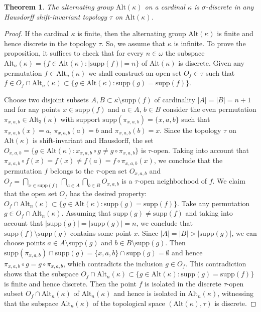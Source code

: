 \documentclass[11pt, twoside]{amsart}
\newtheorem{theorem}{Theorem}
\theoremstyle{definition}
\begin{document}
\begin{theorem}\label{sigmad} The alternating group ${\mathrm{Alt}}(\kappa)$ on a cardinal $\kappa$ is $\sigma$-discrete in any Hausdorff shift-invariant topology $\tau$ on ${\mathrm{Alt}}(\kappa)$.
\end{theorem}

\begin{proof} If the cardinal $\kappa$ is finite, then the alternating group ${\mathrm{Alt}}(\kappa)$ is finite and hence discrete in the topology $\tau$. So, we assume that $\kappa$ is infinite.  To prove the proposition, it suffices to check that for every $n\in{\omega}$ the subspace ${\mathrm{Alt}}_{n}(\kappa)=\{f\in{\mathrm{Alt}}(\kappa):|{\mathrm{supp}}(f)|= n\}$ of ${\mathrm{Alt}}(\kappa)$ is discrete. Given any permutation $f\in {\mathrm{Alt}}_{n}(\kappa)$ we shall construct an open set $O_f\in\tau$ such that $f\in O_f\cap {\mathrm{Alt}}_n(\kappa)\subset \{g\in {\mathrm{Alt}}(\kappa):{\mathrm{supp}}(g)={\mathrm{supp}}(f)\}$.

Choose two disjoint subsets $A,B\subset \kappa\setminus{\mathrm{supp}}(f)$ of cardinality $|A|=|B|=n+1$ and for any points $x\in{\mathrm{supp}}(f)$ and $a\in A$, $b\in B$  consider the even permutation $\pi_{x,a,b}\in {\mathrm{Alt}}_{3}(\kappa)$ with support ${\mathrm{supp}}(\pi_{x,a,b})=\{x,a,b\}$ such that $\pi_{x,a,b}(x)=a$, $\pi_{x,a,b}(a)=b$ and $\pi_{x,a,b}(b)=x$. Since the topology $\tau$ on ${\mathrm{Alt}}(\kappa)$ is shift-invariant and Hausdorff, the set $O_{x,a,b}=\{g\in{\mathrm{Alt}}(\kappa):x_{x,a,b}\circ g\ne g\circ \pi_{x,a,b}\}$ is $\tau$-open. Taking into account that $\pi_{x,a,b}\circ f(x)=f(x)\ne f(a)=f\circ \pi_{x,a,b}(x)$, we conclude that the permutation $f$ belongs to the $\tau$-open set $O_{x,a,b}$ and $O_f=\bigcap_{x\in {\mathrm{supp}}(f)}\bigcap_{a\in A}\bigcap_{b\in B}O_{x,a,b}$ is a $\tau$-open neighborhood of $f$. We claim that the open set $O_f$ has the desired property: $O_f\cap{\mathrm{Alt}}_{n}(\kappa)\subset\{g\in {\mathrm{Alt}}(\kappa):{\mathrm{supp}}(g)={\mathrm{supp}}(f)\}$. Take any permutation $g\in O_f\cap{\mathrm{Alt}}_n(\kappa)$. Assuming that ${\mathrm{supp}}(g)\ne{\mathrm{supp}}(f)$ and taking into account that $|{\mathrm{supp}}(g)|=|{\mathrm{supp}}(g)|=n$, we conclude that ${\mathrm{supp}}(f)\setminus{\mathrm{supp}}(g)$ contains some point $x$. Since $|A|=|B|>|{\mathrm{supp}}(g)|$, we can choose points $a\in A\setminus{\mathrm{supp}}(g)$ and $b\in B\setminus{\mathrm{supp}}(g)$. Then ${\mathrm{supp}}(\pi_{x,a,b})\cap {\mathrm{supp}}(g)=\{x,a,b\}\cap{\mathrm{supp}}(g)=\emptyset$ and hence $\pi_{x,a,b}\circ g=g\circ \pi_{x,a,b}$, which contradicts the inclusion $g\in O_f$. This contradiction shows that the subspace $O_f\cap{\mathrm{Alt}}_n(\kappa)\subset\{g\in {\mathrm{Alt}}(\kappa):{\mathrm{supp}}(g)={\mathrm{supp}}(f)\}$ is finite and hence discrete. Then the point $f$ is isolated in the discrete $\tau$-open subset $O_f\cap{\mathrm{Alt}}_n(\kappa)$ of ${\mathrm{Alt}}_n(\kappa)$ and hence is isolated in ${\mathrm{Alt}}_n(\kappa)$, witnessing that the subspace ${\mathrm{Alt}}_n(\kappa)$ of the topological space $({\mathrm{Alt}}(\kappa),\tau)$ is discrete.
\end{proof}
\end{document}
